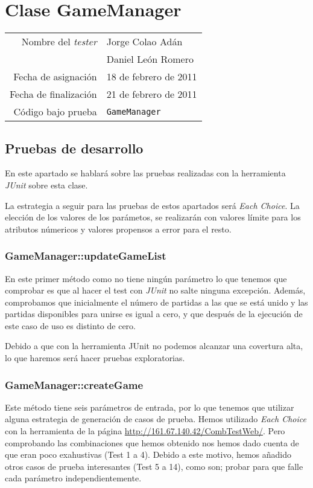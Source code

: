 \section{Clase GameManager}


{\small
\begin{tabular}{r|l}
Nombre del \textit{tester} & Jorge Colao Adán \\
& Daniel León Romero\\
Fecha de asignación & 18 de febrero de 2011 \\
Fecha de finalización & 21 de febrero de 2011 \\
Código bajo prueba & \texttt{GameManager}
\end{tabular}
}

\subsection{Pruebas de desarrollo}

En este apartado se hablará sobre las pruebas realizadas con la herramienta \textit{JUnit} sobre esta clase.

La estrategia a seguir para las pruebas de estos apartados será \textit{Each Choice}. La elección de los valores de los parámetos, se realizarán con valores límite para los atributos númericos y valores propensos a error para el resto.

\subsubsection{GameManager::updateGameList}

En este primer método como no tiene ningún parámetro lo que tenemos que comprobar es que al hacer el test con \textit{JUnit} no salte ninguna excepción. Además, comprobamos que inicialmente el número de partidas a las que se está unido y las partidas disponibles para unirse es igual a cero, y que después de la ejecución de este caso de uso es distinto de cero.

Debido a que con la herramienta JUnit no podemos alcanzar una covertura alta, lo que haremos será hacer pruebas exploratorias.

\subsubsection{GameManager::createGame}

Este método tiene seis parámetros de entrada, por lo que tenemos que utilizar alguna estrategia de generación de casos de prueba. Hemos utilizado \textit{Each Choice} con la herramienta de la página \url{http://161.67.140.42/CombTestWeb/}. Pero comprobando las combinaciones que hemos obtenido nos hemos dado cuenta de que eran poco exahustivas (Test 1 a 4). Debido a este motivo, hemos añadido otros casos de prueba interesantes (Test 5 a 14), como son; probar para que falle cada parámetro independientemente.

